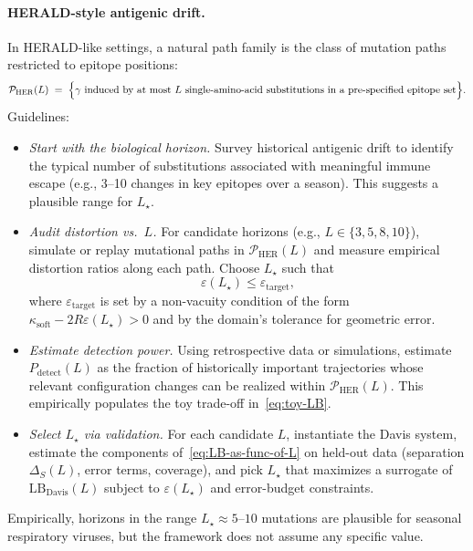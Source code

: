 \documentclass[11pt]{article}
\begin{document}
\paragraph{HERALD-style antigenic drift.}
In HERALD-like settings, a natural path family is the class of mutation paths restricted to
epitope positions:
\[
\mathcal{P}_{\mathrm{HER}}(L)
\;=\;
\Bigl\{ \gamma \text{ induced by at most $L$ single-amino-acid substitutions in a pre-specified
epitope set} \Bigr\}.
\]
Guidelines:
\begin{itemize}[leftmargin=*]
  \item \emph{Start with the biological horizon.} Survey historical antigenic drift to identify the
  typical number of substitutions associated with meaningful immune escape (e.g., 3--10 changes in
  key epitopes over a season). This suggests a plausible range for $L_\star$.

  \item \emph{Audit distortion vs.\ $L$.} For candidate horizons (e.g., $L \in \{3,5,8,10\}$), simulate
  or replay mutational paths in $\mathcal{P}_{\mathrm{HER}}(L)$ and measure empirical distortion
  ratios along each path. Choose $L_\star$ such that
  \[
    \varepsilon(L_\star) \le \varepsilon_{\text{target}},
  \]
  where $\varepsilon_{\text{target}}$ is set by a non-vacuity condition of the form
  $\kappa_{\mathrm{soft}} - 2R \varepsilon(L_\star) > 0$ and by the domain’s tolerance for geometric error.

  \item \emph{Estimate detection power.} Using retrospective data or simulations, estimate
  $P_{\mathrm{detect}}(L)$ as the fraction of historically important trajectories whose relevant
  configuration changes can be realized within $\mathcal{P}_{\mathrm{HER}}(L)$. This empirically populates
  the toy trade-off in~\eqref{eq:toy-LB}.

  \item \emph{Select $L_\star$ via validation.} For each candidate $L$, instantiate the Davis
  system, estimate the components of~\eqref{eq:LB-as-func-of-L} on held-out data (separation
  $\Delta_S(L)$, error terms, coverage), and pick $L_\star$ that maximizes a surrogate of
  $\mathrm{LB}_{\text{Davis}}(L)$ subject to $\varepsilon(L_\star)$ and error-budget constraints.
\end{itemize}

Empirically, horizons in the range $L_\star \approx 5$--$10$ mutations are plausible for seasonal
respiratory viruses, but the framework does not assume any specific value.
\end{document}
